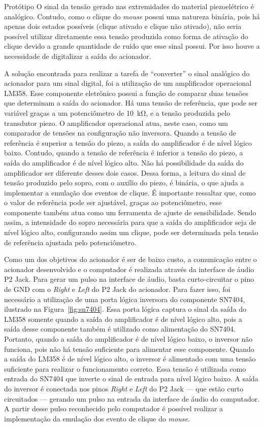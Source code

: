 \begin{chapter}{Protótipo}
O sinal da tensão gerado nas extremidades do material piezoelétrico é analógico.
Contudo, como o clique do \textit{mouse} possui uma natureza binária, pois há
apenas dois estados possíveis (clique ativado e clique não ativado), não
seria possível utilizar diretamente essa tensão produzida como forma de ativação
do clique devido a grande quantidade de ruído que esse sinal possui. Por isso 
houve a necessidade de digitalizar a saída do acionador.

A solução encontrada para realizar a tarefa de ``converter'' o sinal analógico
do acionador para um sinal digital, foi a utilização de um amplificador
operacional LM358. Esse componente eletrônico possui a função de comparar duas
tensões que determinam a saída do acionador. Há uma tensão de referência, que
pode ser variável graças a um potenciômetro de 10~k\si{\ohm}, e a tensão
produzida pelo transdutor piezo. O amplificador operacional atua, neste caso,
como um comparador de tensões na configuração não inversora. Quando a tensão de
referência é superior a tensão do piezo, a saída do amplificador é de nível
lógico baixo. Contudo, quando a tensão de referência é inferior a tensão do
piezo, a saída do amplificador é de nível lógico alto. Não há possibilidade da
saída do amplificador ser diferente desses dois casos. Dessa forma, a leitura do
sinal de tensão produzido pelo sopro, com o auxílio do piezo, é binária, o que
ajuda a implementar a emulação dos eventos de clique. É importante ressaltar
que, como o valor de referência pode ser ajustável, graças ao potenciômetro,
esse componente também atua como um ferramenta de ajuste de sensibilidade. Sendo
assim, a intensidade do sopro necessária para que a saída do amplificador seja
de nível lógico alto, configurando assim um clique, pode ser determinada pela
tensão de referência ajustada pelo potenciômetro.

Como um dos objetivos do acionador é ser de baixo custo, a comunicação entre o
acionador desenvolvido e o computador é realizada através da interface de áudio
P2 Jack. Para gerar um pulso na interface de áudio, basta curto-circuitar o pino
de GND com o \textit{Right} e \textit{Left} do P2 Jack do acionador. Para fazer
isso, foi necessário a utilização de uma porta lógica inversora do componente
SN7404, ilustrado na Figura~\ref{fig:sn7404}. Essa porta lógica captura o sinal
da saída do LM358 somente quando a saída do amplificador é de nível lógico alto,
pois a saída desse componente também é utilizado como alimentação do SN7404.
Portanto, quando a saída do amplificador é de nível lógico baixo, o inversor não
funciona, pois não há tensão suficiente para alimentar esse componente. Quando a
saída do LM358 é de nível lógico alto, o inversor é alimentado com uma tensão
suficiente para realizar o funcionamento correto. Essa tensão é utilizada como
entrada do SN7404 que inverte o sinal de entrada para nível lógico baixo. A
saída do inversor é conectada nos pinos  \textit{Right} e \textit{Left} do P2
Jack --- que estão curto circuitados --- gerando um pulso na entrada da
interface de áudio do computador. A partir desse pulso reconhecido pelo
computador é possível realizar a implementação da emulação dos evento de clique
do \textit{mouse}.


\end{chapter}
